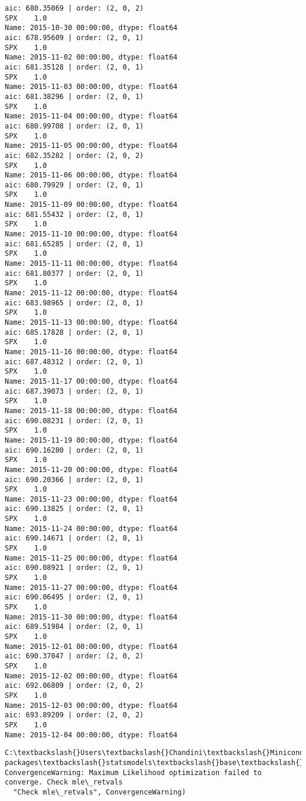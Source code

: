 \documentclass[11pt]{article}
\begin{document}
    \begin{Verbatim}[commandchars=\\\{\}]
aic: 680.35069 | order: (2, 0, 2)
SPX    1.0
Name: 2015-10-30 00:00:00, dtype: float64
aic: 678.95609 | order: (2, 0, 1)
SPX    1.0
Name: 2015-11-02 00:00:00, dtype: float64
aic: 681.35128 | order: (2, 0, 1)
SPX    1.0
Name: 2015-11-03 00:00:00, dtype: float64
aic: 681.38296 | order: (2, 0, 1)
SPX    1.0
Name: 2015-11-04 00:00:00, dtype: float64
aic: 680.99708 | order: (2, 0, 1)
SPX    1.0
Name: 2015-11-05 00:00:00, dtype: float64
aic: 682.35282 | order: (2, 0, 2)
SPX    1.0
Name: 2015-11-06 00:00:00, dtype: float64
aic: 680.79929 | order: (2, 0, 1)
SPX    1.0
Name: 2015-11-09 00:00:00, dtype: float64
aic: 681.55432 | order: (2, 0, 1)
SPX    1.0
Name: 2015-11-10 00:00:00, dtype: float64
aic: 681.65285 | order: (2, 0, 1)
SPX    1.0
Name: 2015-11-11 00:00:00, dtype: float64
aic: 681.80377 | order: (2, 0, 1)
SPX    1.0
Name: 2015-11-12 00:00:00, dtype: float64
aic: 683.98965 | order: (2, 0, 1)
SPX    1.0
Name: 2015-11-13 00:00:00, dtype: float64
aic: 685.17828 | order: (2, 0, 1)
SPX    1.0
Name: 2015-11-16 00:00:00, dtype: float64
aic: 687.48312 | order: (2, 0, 1)
SPX    1.0
Name: 2015-11-17 00:00:00, dtype: float64
aic: 687.39073 | order: (2, 0, 1)
SPX    1.0
Name: 2015-11-18 00:00:00, dtype: float64
aic: 690.08231 | order: (2, 0, 1)
SPX    1.0
Name: 2015-11-19 00:00:00, dtype: float64
aic: 690.16280 | order: (2, 0, 1)
SPX    1.0
Name: 2015-11-20 00:00:00, dtype: float64
aic: 690.20366 | order: (2, 0, 1)
SPX    1.0
Name: 2015-11-23 00:00:00, dtype: float64
aic: 690.13825 | order: (2, 0, 1)
SPX    1.0
Name: 2015-11-24 00:00:00, dtype: float64
aic: 690.14671 | order: (2, 0, 1)
SPX    1.0
Name: 2015-11-25 00:00:00, dtype: float64
aic: 690.08921 | order: (2, 0, 1)
SPX    1.0
Name: 2015-11-27 00:00:00, dtype: float64
aic: 690.06495 | order: (2, 0, 1)
SPX    1.0
Name: 2015-11-30 00:00:00, dtype: float64
aic: 689.51984 | order: (2, 0, 1)
SPX    1.0
Name: 2015-12-01 00:00:00, dtype: float64
aic: 690.37047 | order: (2, 0, 2)
SPX    1.0
Name: 2015-12-02 00:00:00, dtype: float64
aic: 692.06809 | order: (2, 0, 2)
SPX    1.0
Name: 2015-12-03 00:00:00, dtype: float64
aic: 693.89209 | order: (2, 0, 2)
SPX    1.0
Name: 2015-12-04 00:00:00, dtype: float64

    \end{Verbatim}

    \begin{Verbatim}[commandchars=\\\{\}]
C:\textbackslash{}Users\textbackslash{}Chandini\textbackslash{}Miniconda3\textbackslash{}envs\textbackslash{}auquan\textbackslash{}lib\textbackslash{}site-packages\textbackslash{}statsmodels\textbackslash{}base\textbackslash{}model.py:496: ConvergenceWarning: Maximum Likelihood optimization failed to converge. Check mle\_retvals
  "Check mle\_retvals", ConvergenceWarning)

    \end{Verbatim}
\end{document}
